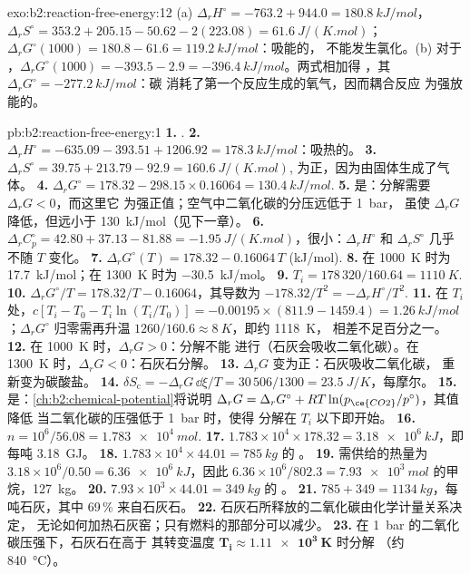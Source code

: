 \begin{solution}{exo:b2:reaction-free-energy:12}
(a) $\Delta_r H^\circ = -763.2 + 944.0 = \qty{+180.8}{kJ/mol}$，$\Delta_r
S^\circ = 353.2 + 205.15 - 50.62 - 2(223.08) = \qty{+61.6}{J/(K.mol)}$；
$\Delta_r G^\circ(1000) = 180.8 - 61.6 = \qty{+119.2}{kJ/mol}$：吸能的，
不能发生氯化。(b) 对于 ，$\Delta_r G^\circ(1000) =
-393.5 - 2.9 = \qty{-396.4}{kJ/mol}$。两式相加得 ，其 $\Delta_r G^\circ = \qty{-277.2}{kJ/mol}$：碳
消耗了第一个反应生成的氧气，因而耦合反应
为强放能的。
\end{solution}

\begin{solution}{pb:b2:reaction-free-energy:1}
\textbf{1.} .
\textbf{2.} $\Delta_r H^\circ = -635.09 - 393.51 + 1206.92 =
\qty{+178.3}{kJ/mol}$：吸热的。
\textbf{3.} $\Delta_r S^\circ = 39.75 + 213.79 - 92.9 = \qty{+160.6}{J/(K.mol)}$,
为正，因为由固体生成了气体。
\textbf{4.} $\Delta_r G^\circ = 178.32 - 298.15 \times 0.16064 =
\qty{+130.4}{kJ/mol}$.
\textbf{5.} 是：分解需要 $\Delta_r G < 0$，而这里它
为强正值；空气中二氧化碳的分压远低于 \qty{1}{bar}，
虽使 $\Delta_r G$ 降低，但远小于 \qty{130}{kJ/mol}（见下一章）。
\textbf{6.} $\Delta_r C^\circ_p = 42.80 + 37.13 - 81.88 =
\qty{-1.95}{J/(K.mol)}$，很小：$\Delta_r H^\circ$ 和 $\Delta_r S^\circ$
几乎不随 $T$ 变化。
\textbf{7.} $\Delta_r G^\circ(T) = 178.32 - 0.16064\,T$ (\unit{kJ/mol}).
\textbf{8.} 在 \qty{1000}{K} 时为 \qty{+17.7}{kJ/mol}；在
\qty{1300}{K} 时为 \qty{-30.5}{kJ/mol}。
\textbf{9.} $T_i = 178\,320/160.64 = \qty{1110}{K}$.
\textbf{10.} $\Delta_r G^\circ/T = 178.32/T - 0.16064$，其导数为
$-178.32/T^2 = -\Delta_r H^\circ/T^2$.
\textbf{11.} 在 $T_i$ 处，$c[T_i - T_0 - T_i\ln(T_i/T_0)] = -0.00195 \times
(811.9 - 1459.4) = \qty{+1.26}{kJ/mol}$；$\Delta_r G^\circ$ 归零需再升温
$1260/160.6 \approx \qty{8}{K}$，即约 \qty{1118}{K}，
相差不足百分之一。
\textbf{12.} 在 \qty{1000}{K} 时，$\Delta_r G > 0$：分解不能
进行（石灰会吸收二氧化碳）。在 \qty{1300}{K} 时，$\Delta_r G <
0$：石灰石分解。
\textbf{13.} $\Delta_r G$ 变为正：石灰吸收二氧化碳，
重新变为碳酸盐。
\textbf{14.} $\delta S_{\text{c}} = -\Delta_r G\,\dd\xi/T = 30\,506/1300 =
\qty{23.5}{J/K}$，每摩尔。
\textbf{15.} 是：\cref{ch:b2:chemical-potential}将说明
$\Delta_r G = \Delta_r G^\circ + RT\ln(p_{\ce{CO2}}/p^\circ)$，其值降低
当二氧化碳的压强低于 \qty{1}{bar} 时，使得
分解在 $T_i$ 以下即开始。
\textbf{16.} $n = 10^6/56.08 = \qty{1.783e4}{mol}$.
\textbf{17.} $1.783 \times 10^4 \times 178.32 = \qty{3.18e6}{kJ}$，即
每吨 \qty{3.18}{GJ}。
\textbf{18.} $1.783 \times 10^4 \times 44.01 = \qty{785}{kg}$ 的 。
\textbf{19.} 需供给的热量为 $3.18 \times 10^6/0.50 = \qty{6.36e6}{kJ}$，因此
$6.36 \times 10^6/802.3 = \qty{7.93e3}{mol}$ 的甲烷，\qty{127}{kg}。
\textbf{20.} $7.93 \times 10^3 \times 44.01 = \qty{349}{kg}$ 的 。
\textbf{21.} $785 + 349 = \qty{1134}{kg}$，每吨石灰，其中 69\,\%
来自石灰石。
\textbf{22.} 石灰石所释放的二氧化碳由化学计量关系决定，
无论如何加热石灰窑；只有燃料的那部分可以减少。
\textbf{23.} 在 \qty{1}{bar} 的二氧化碳压强下，石灰石在高于
其转变温度 $\boldsymbol{T_i \approx \qty{1.11e3}{K}}$ 时分解
（约 \qty{840}{\celsius}）。
\end{solution}
